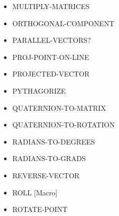 \documentclass [11pt]{book}
\begin{document}
\begin{itemize}
\item {}MULTIPLY-MATRICES





\item {}ORTHOGONAL-COMPONENT





\item {}PARALLEL-VECTORS?





\item {}PROJ-POINT-ON-LINE





\item {}PROJECTED-VECTOR





\item {}PYTHAGORIZE





\item {}QUATERNION-TO-MATRIX





\item {}QUATERNION-TO-ROTATION





\item {}RADIANS-TO-DEGREES





\item {}RADIANS-TO-GRADS





\item {}REVERSE-VECTOR





\item {}ROLL [Macro]





\item {}ROTATE-POINT






\end{itemize}
\end{document}
